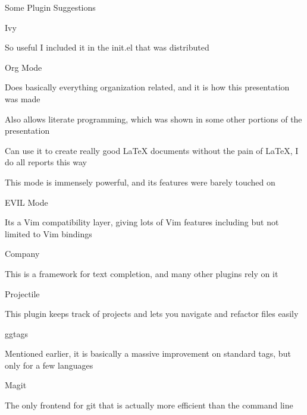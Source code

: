 \documentclass[presentation]{beamer}
\begin{document}
\begin{frame}[label=sec-6]{Some Plugin Suggestions}
\begin{block}{Ivy}
\begin{block}{So useful I included it in the init.el that was distributed}
\end{block}
\end{block}
\begin{block}{Org Mode}
\begin{block}{Does basically everything organization related, and it is how this presentation was made}
\end{block}
\begin{block}{Also allows literate programming, which was shown in some other portions of the presentation}
\end{block}
\begin{block}{Can use it to create really good \LaTeX{} documents without the pain of \LaTeX{}, I do all reports this way}
\end{block}
\begin{block}{This mode is immensely powerful, and its features were barely touched on}
\end{block}
\end{block}
\begin{block}{EVIL Mode}
\begin{block}{Its a Vim compatibility layer, giving lots of Vim features including but not limited to Vim bindings}
\end{block}
\end{block}
\begin{block}{Company}
\begin{block}{This is a framework for text completion, and many other plugins rely on it}
\end{block}
\end{block}
\begin{block}{Projectile}
\begin{block}{This plugin keeps track of projects and lets you navigate and refactor files easily}
\end{block}
\end{block}
\begin{block}{ggtags}
\begin{block}{Mentioned earlier, it is basically a massive improvement on standard tags, but only for a few languages}
\end{block}
\end{block}
\begin{block}{Magit}
\begin{block}{The only frontend for git that is actually more efficient than the command line}

\end{block}
\end{block}
\end{frame}
\end{document}
